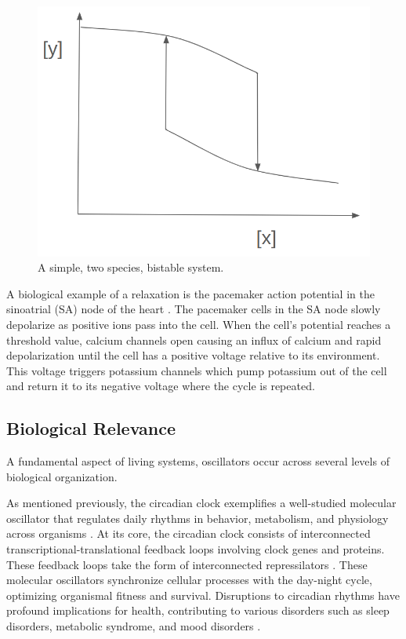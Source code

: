 \documentclass[12pt]{report}
\begin{document}
\begin{figure}
    \centering
    \includegraphics[width=12cm]{images/bistability.png}
    \caption[A simple bistable system]{A simple, two species, bistable system.}
    \label{fig:bistability}
\end{figure}

A biological example of a relaxation is the pacemaker action potential in the sinoatrial (SA) node of the heart \cite{SAnode}. The pacemaker cells in the SA node slowly depolarize as positive ions pass into the cell. When the cell's potential reaches a threshold value, calcium channels open causing an influx of calcium and rapid depolarization until the cell has a positive voltage relative to its environment. This voltage triggers potassium channels which pump potassium out of the cell and return it to its negative voltage where the cycle is repeated.

\subsection{Biological Relevance}
A fundamental aspect of living systems, oscillators occur across several levels of biological organization. 

As mentioned previously, the circadian clock exemplifies a well-studied molecular oscillator that regulates daily rhythms in behavior, metabolism, and physiology across organisms \cite{circadianReview, circadianOverview}. At its core, the circadian clock consists of interconnected transcriptional-translational feedback loops involving clock genes and proteins. These feedback loops take the form of interconnected repressilators \cite{YAMASHINO2013, Pett2016}. These molecular oscillators synchronize cellular processes with the day-night cycle, optimizing organismal fitness and survival. Disruptions to circadian rhythms have profound implications for health, contributing to various disorders such as sleep disorders, metabolic syndrome, and mood disorders \cite{circadianReview}.
\end{document}
